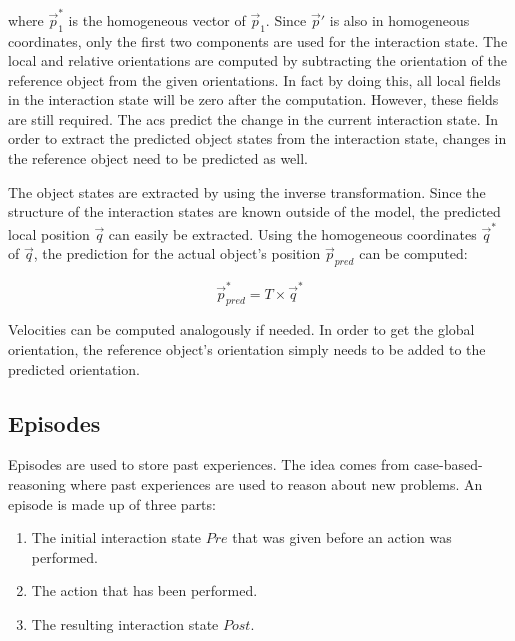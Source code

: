 where $\vec{p}_1^*$ is the homogeneous vector of $\vec{p}_1$. Since $\vec{p}'$ is also in homogeneous coordinates, only the first two components are used for the interaction state. The local and relative orientations are computed by subtracting the orientation of the reference object from the given orientations. In fact by doing this, all local fields in the interaction state will be zero after the computation. However, these fields are still required. The \glspl{ac} predict the change in the current interaction state. In order to extract the predicted object states from the interaction state, changes in the reference object need to be predicted as well. 

The object states are extracted by using the inverse transformation. Since the structure of the interaction states are known outside of the model, the predicted local position $\vec{q}$ can easily be extracted. Using the homogeneous coordinates $\vec{q}^*$ of $\vec{q}$, the prediction for the actual object's position $\vec{p}_{pred}$ can be computed:

\begin{equation}
\vec{p}_{pred}^* = T \times \vec{q}^*
\end{equation}

Velocities can be computed analogously if needed.
In order to get the global orientation, the reference object's orientation simply needs to be added to the predicted orientation. 

\subsection{Episodes \label{sec:episodes}}

Episodes are used to store past experiences. The idea comes from case-based-reasoning \cite{cbr} where past experiences are used to reason about new problems. An episode is made up of three parts: 
\begin{enumerate}
\item The initial interaction state $Pre$ that was given before an action was performed.
\item The action that has been performed.
\item The resulting interaction state $Post$.
\end{enumerate}

